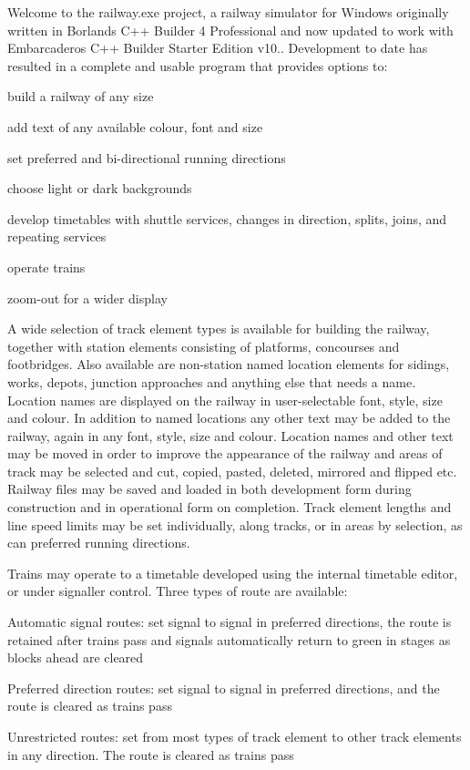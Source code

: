 Welcome to the railway.\+exe project, a railway simulator for Windows originally written in Borland\textquotesingle{}s C++ Builder 4 Professional and now updated to work with Embarcadero\textquotesingle{}s C++ Builder Starter Edition v10.. Development to date has resulted in a complete and usable program that provides options to\+:


\begin{DoxyItemize}
\item build a railway of any size
\item add text of any available colour, font and size
\item set preferred and bi-\/directional running directions
\item choose light or dark backgrounds
\item develop timetables with shuttle services, changes in direction, splits, joins, and repeating services
\item operate trains
\item zoom-\/out for a wider display
\end{DoxyItemize}

A wide selection of track element types is available for building the railway, together with station elements consisting of platforms, concourses and footbridges. Also available are non-\/station named location elements for sidings, works, depots, junction approaches and anything else that needs a name. Location names are displayed on the railway in user-\/selectable font, style, size and colour. In addition to named locations any other text may be added to the railway, again in any font, style, size and colour. Location names and other text may be moved in order to improve the appearance of the railway and areas of track may be selected and cut, copied, pasted, deleted, mirrored and flipped etc. Railway files may be saved and loaded in both development form during construction and in operational form on completion. Track element lengths and line speed limits may be set individually, along tracks, or in areas by selection, as can preferred running directions.

Trains may operate to a timetable developed using the internal timetable editor, or under signaller control. Three types of route are available\+:


\begin{DoxyEnumerate}
\item Automatic signal routes\+: set signal to signal in preferred directions, the route is retained after trains pass and signals automatically return to green in stages as blocks ahead are cleared
\item Preferred direction routes\+: set signal to signal in preferred directions, and the route is cleared as trains pass
\item Unrestricted routes\+: set from most types of track element to other track elements in any direction. The route is cleared as trains pass
\end{DoxyEnumerate}

